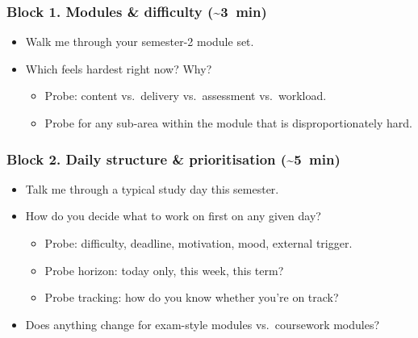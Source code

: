 \documentclass[a4paper,11pt]{article}
\begin{document}
\subsubsection*{Block 1. Modules \& difficulty (\textasciitilde3~min)}
\begin{itemize}[leftmargin=1.2em,itemsep=2pt]
    \item Walk me through your semester-2 module set.
    \item Which feels hardest right now? Why?
        \begin{itemize}[leftmargin=1em]
            \item Probe: content vs.\ delivery vs.\ assessment vs.\ workload.
            \item Probe for any sub-area within the module that is
                  disproportionately hard.
        \end{itemize}
\end{itemize}

\subsubsection*{Block 2. Daily structure \& prioritisation (\textasciitilde5~min)}
\begin{itemize}[leftmargin=1.2em,itemsep=2pt]
    \item Talk me through a typical study day this semester.
    \item How do you decide what to work on first on any given day?
        \begin{itemize}[leftmargin=1em]
            \item Probe: difficulty, deadline, motivation, mood,
                  external trigger.
            \item Probe horizon: today only, this week, this term?
            \item Probe tracking: how do you know whether you're on
                  track?
        \end{itemize}
    \item Does anything change for exam-style modules vs.\ coursework
          modules?
\end{itemize}
\end{document}
